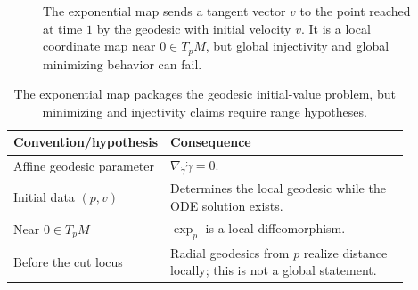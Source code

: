 \begin{figure}[htbp]
\centering
{}
\caption{The exponential map sends a tangent vector $v$ to the point reached at time
$1$ by the geodesic with initial velocity $v$. It is a local coordinate map near
$0\in T_pM$, but global injectivity and global minimizing behavior can fail.}
\label{fig:vii23-c07-expmap}
\end{figure}

\begin{table}[htbp]
\centering\small
\begin{tabular}{p{0.27\linewidth}p{0.61\linewidth}}
\toprule
Convention/hypothesis & Consequence\\
\midrule
Affine geodesic parameter & $\nabla_{\dot\gamma}\dot\gamma=0$.\\
Initial data $(p,v)$ & Determines the local geodesic while the ODE solution exists.\\
Near $0\in T_pM$ & $\exp_p$ is a local diffeomorphism.\\
Before the cut locus & Radial geodesics from $p$ realize distance locally; this is not a global statement.\\
\bottomrule
\end{tabular}
\caption{The exponential map packages the geodesic initial-value problem, but minimizing and injectivity claims require range hypotheses.}
\label{tab:vii23-c07-expmap-conventions}
\end{table}
